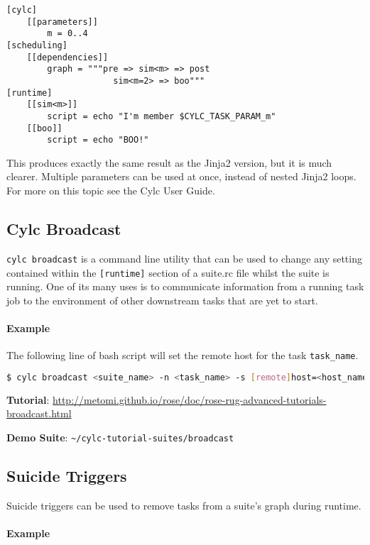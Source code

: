 \begin{lstlisting}
[cylc]
    [[parameters]]
        m = 0..4
[scheduling]
    [[dependencies]]
        graph = """pre => sim<m> => post
                     sim<m=2> => boo"""
[runtime]
    [[sim<m>]]
        script = echo "I'm member $CYLC_TASK_PARAM_m"
    [[boo]]
        script = echo "BOO!"
\end{lstlisting}

This produces exactly the same result as the Jinja2 version, but it is much
clearer. Multiple parameters can be used at once, instead of nested Jinja2
loops.  For more on this topic see the Cylc User Guide.


\subsection{Cylc Broadcast}

\lstinline[language=bash]{cylc broadcast} is a command line utility that can
be used to change any setting contained within the \lstinline{[runtime]}
section of a suite.rc file whilst the suite is running. One of its many uses is
to communicate information from a running task job to the environment of other
downstream tasks that are yet to start.

\paragraph*{Example} The following line of bash script will set the remote
host for the task \lstinline{task_name}.

\begin{lstlisting}[language=bash]
$ cylc broadcast <suite_name> -n <task_name> -s [remote]host=<host_name>
\end{lstlisting}

\begin{shaded*}
\textbf{Tutorial}: \url{http://metomi.github.io/rose/doc/rose-rug-advanced-tutorials-broadcast.html}

\textbf{Demo Suite}: \lstinline=~/cylc-tutorial-suites/broadcast=
\end{shaded*}

\subsection{Suicide Triggers}

Suicide triggers can be used to remove tasks from a suite's graph during
runtime.

\paragraph*{Example}

